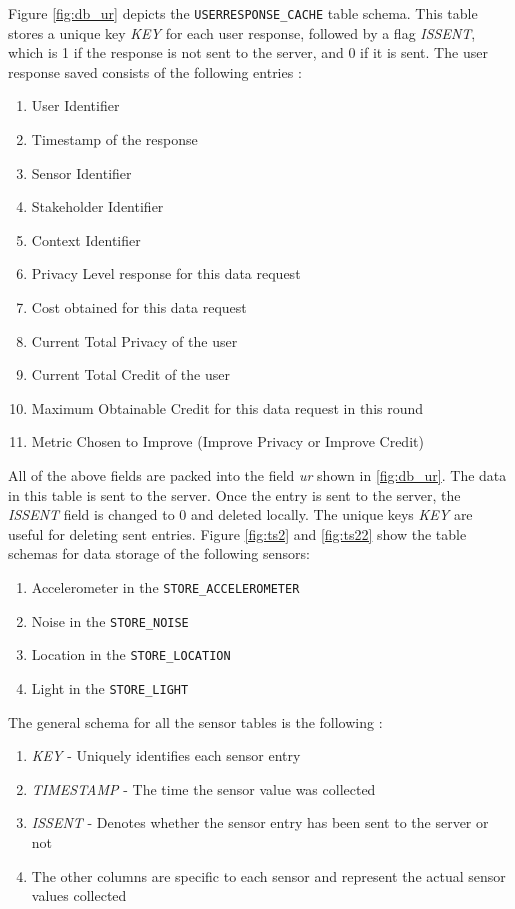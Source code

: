 Figure \ref{fig:db_ur} depicts the \texttt{USERRESPONSE\_CACHE} table schema. This table stores a unique key \textit{KEY} for each user response, followed by a flag \textit{ISSENT}, which is 1 if the response is not sent to the server, and 0 if it is sent. The user response saved consists of the following entries :

\begin{enumerate}
	\item User Identifier
	\item Timestamp of the response
    \item Sensor Identifier
    \item Stakeholder Identifier
    \item Context Identifier
    \item Privacy Level response for this data request
    \item Cost obtained for this data request
    \item Current Total Privacy of the user
    \item Current Total Credit of the user
    \item Maximum Obtainable Credit for this data request in this round
    \item Metric Chosen to Improve  (Improve Privacy or Improve Credit)
\end{enumerate}

All of the above fields are packed into the field \textit{ur} shown in \ref{fig:db_ur}. The data in this table is sent to the server. Once the entry is sent to the server, the \textit{ISSENT} field is changed to 0 and deleted locally. The unique keys \textit{KEY} are useful for deleting sent entries. Figure \ref{fig:ts2} and \ref{fig:ts22} show the table schemas for data storage of the following sensors:

\begin{enumerate}
	\item Accelerometer in the \texttt{STORE\_ACCELEROMETER}
	\item Noise in the \texttt{STORE\_NOISE}
    \item Location in the  \texttt{STORE\_LOCATION}
    \item Light in the  \texttt{STORE\_LIGHT}
\end{enumerate}

The general schema for all the sensor tables is the following :

\begin{enumerate}
	\item \textit{KEY} - Uniquely identifies each sensor entry
	\item \textit{TIMESTAMP} - The time the sensor value was collected
    \item \textit{ISSENT} - Denotes whether the sensor entry has been sent to the server or not
    \item The other columns are specific to each sensor and represent the actual sensor values collected 
\end{enumerate}

